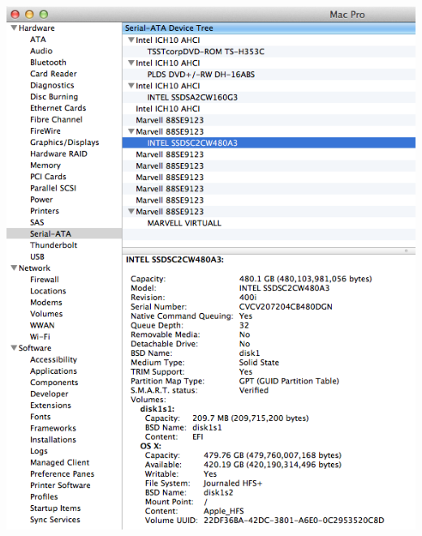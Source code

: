 \documentclass[11pt]{article}
\begin{document}
\includegraphics[scale=0.65]{trim.png}
\end{document}
